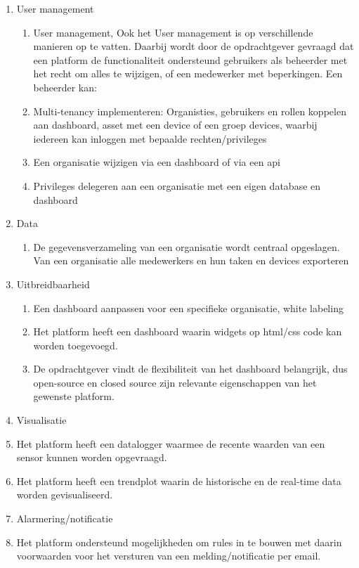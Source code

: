 \begin{enumerate}
	\item User management
	\begin{enumerate}
		\item User management, Ook het User management is op verschillende manieren op te vatten. Daarbij wordt door de opdrachtgever gevraagd dat een platform de functionaliteit ondersteund gebruikers als beheerder met het recht om alles te wijzigen, of een medewerker met beperkingen. Een beheerder kan:
		\item Multi-tenancy implementeren: Organisties, gebruikers en rollen koppelen aan dashboard, asset met een device of een groep devices, waarbij iedereen kan inloggen met bepaalde rechten/privileges
		\item Een organisatie wijzigen via een dashboard of via een api
		\item Privileges delegeren aan een organisatie met een eigen database en dashboard
	\end{enumerate}
	\item Data
	\begin{enumerate}
		\item De gegevensverzameling van een organisatie wordt centraal opgeslagen.
		Van een organisatie alle medewerkers en hun taken en devices exporteren
	\end{enumerate}
	\item Uitbreidbaarheid     
	\begin{enumerate}
		\item Een dashboard aanpassen voor een specifieke organisatie, white labeling
		\item Het platform heeft een dashboard waarin widgets op html/css code kan worden toegevoegd.
		\item De opdrachtgever vindt de flexibiliteit van het dashboard belangrijk, dus  open-source en closed source zijn relevante eigenschappen van het gewenste platform.
	\end{enumerate}
	\item Visualisatie
	\item Het platform heeft een datalogger waarmee de recente waarden van een sensor kunnen worden opgevraagd.
	\item Het platform heeft een trendplot waarin de historische en de real-time data worden gevisualiseerd.
	\item Alarmering/notificatie
	\item Het platform ondersteund mogelijkheden om rules in te bouwen met daarin voorwaarden voor het versturen van een melding/notificatie per email.

\end{enumerate}
